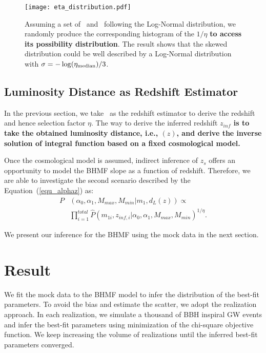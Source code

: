 \documentclass[twocolumn]{aastex62}
\begin{document}
\begin{figure}%
\texttt{[image: eta\_distribution.pdf]}
\caption{
Assuming a set of \dl\ and \cmass\ following the Log-Normal distribution, we randomly produce the corresponding histogram of the $1/\eta$ {\bf to access its possibility distribution}. The result shows that the skewed distribution could be well described by a Log-Normal distribution with $\sigma = -\log(\eta_{\rm median})/3$.
}
\label{fig_eta}
\end{figure}

\subsection{Luminosity Distance as Redshift Estimator} 
\label{sec_dl_z}
In the previous section, we take \dl\ as the redshift estimator to derive the redshift and hence selection factor $\eta$. The way to derive the inferred redshift {\bf $z_{inf}$ is to take the obtained luminosity distance, i.e.,  \dl$(z)$, and derive the inverse solution of integral function based on a fixed cosmological model.}

Once the cosmological model is assumed, indirect inference of $z_s$ offers an opportunity to model the BHMF slope as a function of redshift. Therefore, we are able to investigate the second scenario described by the Equation~(\ref{equ_alphaz}) as:
 \begin{equation} \label{equ_lik_alphaz}
 \begin{split}
 P&(\alpha_0, \alpha_1, M_{max}, M_{min}|m_{1},d_L(z)) \propto \\
  &\prod_{i=1}^{total} \hat{P}(m_{1i}, z_{inf,i} |\alpha_0, \alpha_1, M_{max}, M_{min})^{1/\eta}.
  \end{split}
 \end{equation}
 
 We present our inference for the BHMF using the mock data in the next section. 


\vspace{1cm}
\section{Result}\label{sec_result}
We fit the mock data to the BHMF model to infer the distribution of the best-fit parameters. To avoid the bias and estimate the scatter, we adopt the realization approach. In each realization, we simulate a thousand of BBH inspiral GW events and infer the best-fit parameters using minimization of the chi-square objective function. We keep increasing the volume of realizations until the inferred best-fit parameters converged.
\end{document}
